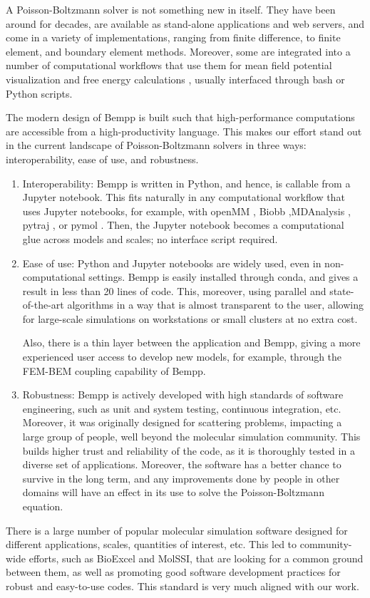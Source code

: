 A Poisson-Boltzmann solver is not something new in itself.
They have been around for decades, are available as stand-alone applications and web servers, and come in a variety of implementations, ranging from finite difference, to finite element, and boundary element methods.
Moreover, some are integrated into a number of computational workflows that use them for mean field potential visualization \cite{HumphreyETal1996} and free energy calculations \cite{MillerETal2012,KumariETal2014,WangETal2018}, usually interfaced through bash or Python scripts.

The modern design of Bempp is built such that high-performance computations are accessible from a high-productivity language.
This makes our effort stand out in the current landscape of Poisson-Boltzmann solvers in three ways: interoperability, ease of use, and robustness. 
\begin{enumerate}
\item Interoperability: Bempp is written in Python, and hence, is callable from a Jupyter notebook. This fits naturally in any computational workflow that uses Jupyter notebooks, for example, with openMM \cite{EastmanETal2017}, Biobb \cite{AndrioETal2019},MDAnalysis \cite{GowersETal2019}, pytraj \cite{RoeCheatham2013}, or pymol \cite{PyMOL}. Then, the Jupyter notebook becomes a computational glue across models and scales; no interface script required. 

\item Ease of use: Python and Jupyter notebooks are widely used, even in non-computational settings. Bempp is easily installed through conda, and gives a result in less than 20 lines of code. This, moreover, using parallel and state-of-the-art algorithms in a way that is almost transparent to the user, allowing for large-scale simulations on workstations or small clusters at no extra cost.

Also, there is a thin layer between the application and Bempp, giving a more experienced user access to develop new models, for example, through the FEM-BEM coupling capability of Bempp.

\item Robustness: Bempp is actively developed with high standards of software engineering, such as unit and system testing, continuous integration, etc. Moreover, it was originally designed for scattering problems, impacting a large group of people, well beyond the molecular simulation community. This builds higher trust and reliability of the code, as it is thoroughly tested in a diverse set of applications. Moreover, the software has a better chance to survive in the long term, and any improvements done by people in other domains will have an effect in its use to solve the Poisson-Boltzmann equation. 

\end{enumerate}

There is a large number of popular molecular simulation software designed for different applications, scales, quantities of interest, etc.
This led to community-wide efforts, such as BioExcel and MolSSI, that are looking for a common ground between them, as well as promoting good software development practices for robust and easy-to-use codes.
This standard is very much aligned with our work.
